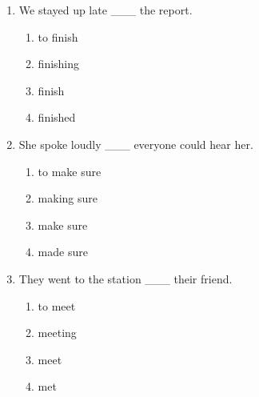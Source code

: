 \documentclass[11pt,a4paper]{ctexart}
\begin{document}
\begin{enumerate}[leftmargin=*,itemsep=4pt]
\begin{enumerate}[label=\Alph*.,leftmargin=2em,itemsep=1pt,topsep=2pt]
\item caught
\end{enumerate}
\item We stayed up late \_\_\_ the report.
\begin{enumerate}[label=\Alph*.,leftmargin=2em,itemsep=1pt,topsep=2pt]
\item to finish
\item finishing
\item finish
\item finished
\end{enumerate}
\item She spoke loudly \_\_\_ everyone could hear her.
\begin{enumerate}[label=\Alph*.,leftmargin=2em,itemsep=1pt,topsep=2pt]
\item to make sure
\item making sure
\item make sure
\item made sure
\end{enumerate}
\item They went to the station \_\_\_ their friend.
\begin{enumerate}[label=\Alph*.,leftmargin=2em,itemsep=1pt,topsep=2pt]
\item to meet
\item meeting
\item meet
\item met
\end{enumerate}
\end{enumerate}
\end{document}
